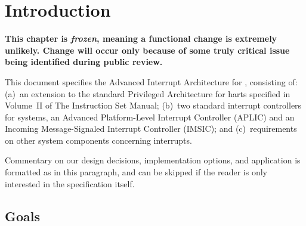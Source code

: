 
\chapter{Introduction}
\label{ch:intro}

\textbf{%
This chapter is \emph{frozen}, meaning
a functional change is extremely unlikely.
Change will occur only because of some truly critical issue
being identified during public review.%
}
\bigskip

This document specifies the Advanced Interrupt Architecture for
{\RISCV}, consisting of:
(a)~an extension to the standard Privileged Architecture for {\RISCV}
harts specified in Volume~II of The {\RISCV} Instruction Set Manual;
(b)~two standard interrupt controllers for {\RISCV} systems, an
Advanced Platform-Level Interrupt Controller (APLIC) and an
Incoming Message-Signaled Interrupt Controller (IMSIC); and
(c)~requirements on other system components concerning interrupts.

\begin{commentary}
Commentary on our design decisions, implementation options, and
application is formatted as in this paragraph, and can be skipped if
the reader is only interested in the specification itself.
\end{commentary}

\section{Goals}

